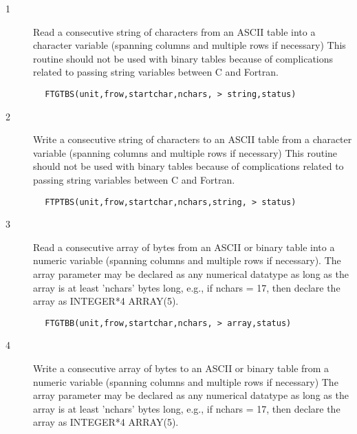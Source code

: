 \documentclass[11pt]{book}
\begin{document}
\begin{description}
\item[1 ] Read a consecutive string of characters from an ASCII table
    into a character variable (spanning columns and multiple rows if necessary)
    This routine should not be used with binary tables because of
   complications related to passing string variables between C and Fortran.
\end{description}

\begin{verbatim}
        FTGTBS(unit,frow,startchar,nchars, > string,status)
\end{verbatim}

\begin{description}
\item[2 ] Write a consecutive string of characters to an ASCII table
    from a character variable (spanning columns and multiple rows if necessary)
    This routine should not be used with binary tables because of
   complications related to passing string variables between C and Fortran.
\end{description}

\begin{verbatim}
        FTPTBS(unit,frow,startchar,nchars,string, > status)
\end{verbatim}

\begin{description}
\item[3 ] Read a consecutive array of bytes from an ASCII or binary table
    into a numeric variable (spanning columns and multiple rows if necessary).
    The array parameter may be declared as any numerical datatype as long
    as the array is at least 'nchars' bytes long, e.g., if nchars = 17,
   then declare the array as INTEGER*4 ARRAY(5).
\end{description}

\begin{verbatim}
        FTGTBB(unit,frow,startchar,nchars, > array,status)
\end{verbatim}

\begin{description}
\item[4 ] Write a consecutive array of bytes to an ASCII or binary table
    from a numeric variable (spanning columns and multiple rows if necessary)
    The array parameter may be declared as any numerical datatype as long
    as the array is at least 'nchars' bytes long, e.g., if nchars = 17,
   then declare the array as INTEGER*4 ARRAY(5).
\end{description}
\end{document}
